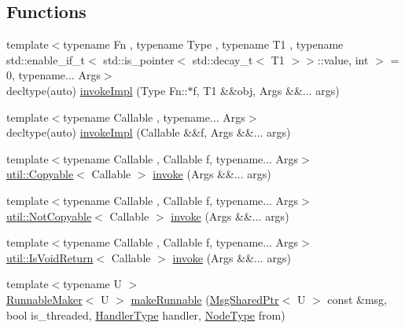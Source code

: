 \subsection*{Functions}
\begin{DoxyCompactItemize}
\item 
{\footnotesize template$<$typename Fn , typename Type , typename T1 , typename std\+::enable\+\_\+if\+\_\+t$<$ std\+::is\+\_\+pointer$<$ std\+::decay\+\_\+t$<$ T1 $>$$>$\+::value, int $>$  = 0, typename... Args$>$ }\\decltype(auto) \hyperlink{namespacevt_1_1runnable_a4253e4fa9c8c6e68da420ab440f2b298}{invoke\+Impl} (Type Fn\+::$\ast$f, T1 \&\&obj, Args \&\&... args)
\item 
{\footnotesize template$<$typename Callable , typename... Args$>$ }\\decltype(auto) \hyperlink{namespacevt_1_1runnable_af14b1c72fc3bf8437c2b89021af7eecf}{invoke\+Impl} (Callable \&\&f, Args \&\&... args)
\item 
{\footnotesize template$<$typename Callable , Callable f, typename... Args$>$ }\\\hyperlink{namespacevt_1_1util_ae9a553985cdc8e9bd4e55f55161f2929}{util\+::\+Copyable}$<$ Callable $>$ \hyperlink{namespacevt_1_1runnable_a14fa3dbf3bef4a683fc7284452b766d3}{invoke} (Args \&\&... args)
\item 
{\footnotesize template$<$typename Callable , Callable f, typename... Args$>$ }\\\hyperlink{namespacevt_1_1util_a0760a3963341a602dfe2dfc42d78c867}{util\+::\+Not\+Copyable}$<$ Callable $>$ \hyperlink{namespacevt_1_1runnable_aa86b7892ea9590c2e8fef9ed0ca4e80c}{invoke} (Args \&\&... args)
\item 
{\footnotesize template$<$typename Callable , Callable f, typename... Args$>$ }\\\hyperlink{namespacevt_1_1util_a97df3e28837417537b3bc035c74f064d}{util\+::\+Is\+Void\+Return}$<$ Callable $>$ \hyperlink{namespacevt_1_1runnable_ad7a4c11af0d8864939dca87f89fba1cb}{invoke} (Args \&\&... args)
\item 
{\footnotesize template$<$typename U $>$ }\\\hyperlink{structvt_1_1runnable_1_1_runnable_maker}{Runnable\+Maker}$<$ U $>$ \hyperlink{namespacevt_1_1runnable_afb8d5dae85a94591271296e201b4f838}{make\+Runnable} (\hyperlink{namespacevt_ab2b3d506ec8e8d1540aede826d84a239}{Msg\+Shared\+Ptr}$<$ U $>$ const \&msg, bool is\+\_\+threaded, \hyperlink{namespacevt_af64846b57dfcaf104da3ef6967917573}{Handler\+Type} handler, \hyperlink{namespacevt_a866da9d0efc19c0a1ce79e9e492f47e2}{Node\+Type} from)

\end{DoxyCompactItemize}
